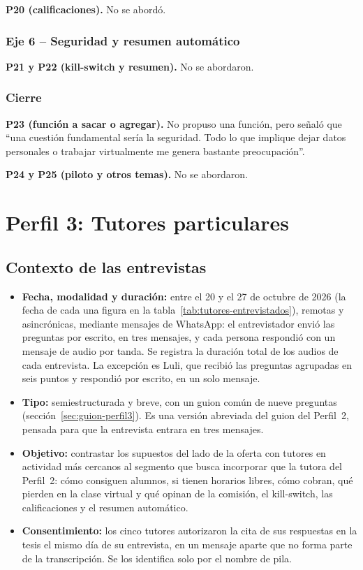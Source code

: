 \textbf{P20 (calificaciones).} No se abordó.

\subsubsection*{Eje 6 -- Seguridad y resumen automático}

\textbf{P21 y P22 (kill-switch y resumen).} No se abordaron.

\subsubsection*{Cierre}

\textbf{P23 (función a sacar o agregar).} No propuso una función, pero
señaló que ``una cuestión fundamental sería la seguridad. Todo lo que
implique dejar datos personales o trabajar virtualmente me genera
bastante preocupación''.

\textbf{P24 y P25 (piloto y otros temas).} No se abordaron.

\section{Perfil 3: Tutores particulares}

\subsection{Contexto de las entrevistas}

\begin{itemize}
    \item \textbf{Fecha, modalidad y duración:} entre el 20 y el 27 de
          octubre de 2026 (la fecha de cada una figura en la
          tabla~\ref{tab:tutores-entrevistados}), remotas y
          asincrónicas, mediante mensajes de WhatsApp: el entrevistador
          envió las preguntas por escrito, en tres mensajes, y cada
          persona respondió con un mensaje de audio por tanda. Se registra
          la duración total de los audios de cada entrevista. La
          excepción es Luli, que recibió las preguntas agrupadas en seis
          puntos y respondió por escrito, en un solo mensaje.
    \item \textbf{Tipo:} semiestructurada y breve, con un guion común de
          nueve preguntas (sección~\ref{sec:guion-perfil3}). Es una
          versión abreviada del guion del Perfil~2, pensada para que la
          entrevista entrara en tres mensajes.
    \item \textbf{Objetivo:} contrastar los supuestos del lado de la
          oferta con tutores en actividad más cercanos al segmento que
          \sistema{} busca incorporar que la tutora del Perfil~2: cómo
          consiguen alumnos, si tienen horarios libres, cómo cobran, qué
          pierden en la clase virtual y qué opinan de la comisión, el
          kill-switch, las calificaciones y el resumen automático.
    \item \textbf{Consentimiento:} los cinco tutores autorizaron la cita
          de sus respuestas en la tesis el mismo día de su entrevista, en
          un mensaje aparte que no forma parte de la transcripción. Se los
          identifica solo por el nombre de pila.
\end{itemize}

